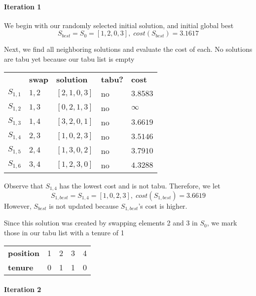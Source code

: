 \documentclass[a4paper]{article}
\newcommand{\subsubsubsection}[1]{\paragraph{#1} \mbox{}}
\begin{document}
\subsubsubsection{Iteration 1}

We begin with our randomly selected initial solution, and initial global best
$$S_\textit{best} = S_0 = [ 1, 2, 0, 3 ], \; \textit{cost}(S_\textit{best}) = 3.1617$$

Next, we find all neighboring solutions and evaluate the cost of each. No solutions are tabu yet because our tabu list is empty
\begin{center}
\begin{tabular}{lllll}
& \textbf{swap}   & \textbf{solution}    & \textbf{tabu?} & \textbf{cost}  \\
$S_{1,1}$ & $1,2$ & $[2, 1, 0, 3]$ & no & $3.8583$ \\
$S_{1,2}$ & $1,3$ & $[0, 2, 1, 3]$ & no & $\infty$ \\
$S_{1,3}$ & $1,4$ & $[3, 2, 0, 1]$ & no & $3.6619$ \\
$S_{1,4}$ & $2,3$ & $[1, 0, 2, 3]$ & no & $3.5146$ \\
$S_{1,5}$ & $2,4$ & $[1, 3, 0, 2]$ & no & $3.7910$ \\
$S_{1,6}$ & $3,4$ & $[1, 2, 3, 0]$ & no & $4.3288$ \\
\end{tabular}
\end{center}
\vspace{1.5em}

Observe that $S_{1,4}$ has the lowest cost and is not tabu. Therefore, we let
$$S_{1, \textit{best}} = S_{1,4} = [1, 0, 2, 3], \; \textit{cost}(S_{1, \textit{best}}) = 3.6619$$
However, $S_\textit{best}$ is not updated because $S_{1, \textit{best}}$'s cost is higher.

Since this solution was created by swapping elements 2 and 3 in $S_0$, we mark those in our tabu list with a tenure of 1
\begin{center}
\begin{tabular}{lllll}
\textbf{position} & 1 & 2 & 3 & 4 \\
\textbf{tenure}   & 0 & 1 & 1 & 0
\end{tabular}
\end{center}
\vspace{1.5em}

\subsubsubsection{Iteration 2}
\end{document}
